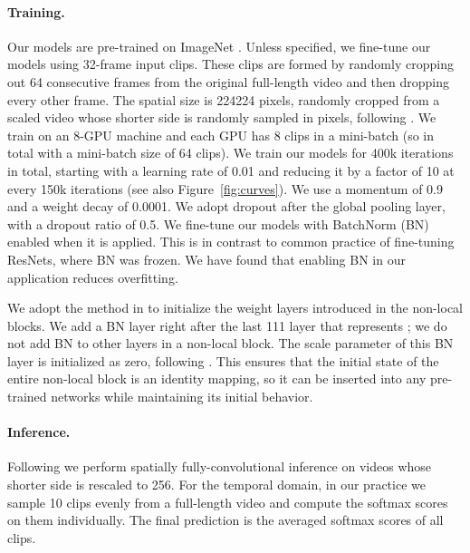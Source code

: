 \documentclass[10pt,twocolumn,letterpaper]{article}
\def\x{}
\begin{document}
\paragraph{Training.} Our models are pre-trained on ImageNet \cite{Russakovsky2015}. Unless specified, we fine-tune our models using 32-frame input clips. These clips are formed by randomly cropping out 64 consecutive frames from the original full-length video and then dropping every other frame. The spatial size is 224\x224 pixels, randomly cropped from a scaled video whose shorter side is randomly sampled in  pixels, following \cite{Simonyan2015}.
We train on an 8-GPU machine and each GPU has 8 clips in a mini-batch (so in total with a mini-batch size of 64 clips). We train our models for 400k iterations in total, starting with a learning rate of 0.01 and reducing it by a factor of 10 at every 150k iterations (see also Figure~\ref{fig:curves}). We use a momentum of 0.9 and a weight decay of 0.0001. We adopt dropout \cite{Hinton2012} after the global pooling layer, with a dropout ratio of 0.5.
We fine-tune our models with BatchNorm (BN) \cite{Ioffe2015} enabled when it is applied. This is in contrast to common practice \cite{He2016} of fine-tuning ResNets, where BN was frozen. We have found that enabling BN in our application reduces overfitting.

We adopt the method in \cite{He2015} to initialize the weight layers introduced in the non-local blocks. We add a BN layer right after the last 1\x1\x1 layer that represents ; we do not add BN to other layers in a non-local block. The scale parameter of this BN layer is initialized as zero, following \cite{Goyal2017}. This ensures that the initial state of the entire non-local block is an identity mapping, so it can be inserted into any pre-trained networks while maintaining its initial behavior.

\paragraph{Inference.} Following \cite{Simonyan2015} we perform spatially fully-convolutional inference on videos whose shorter side is rescaled to 256.
For the temporal domain, in our practice we sample 10 clips evenly from a full-length video and compute the softmax scores on them individually. The final prediction is the averaged softmax scores of all clips.
\end{document}

